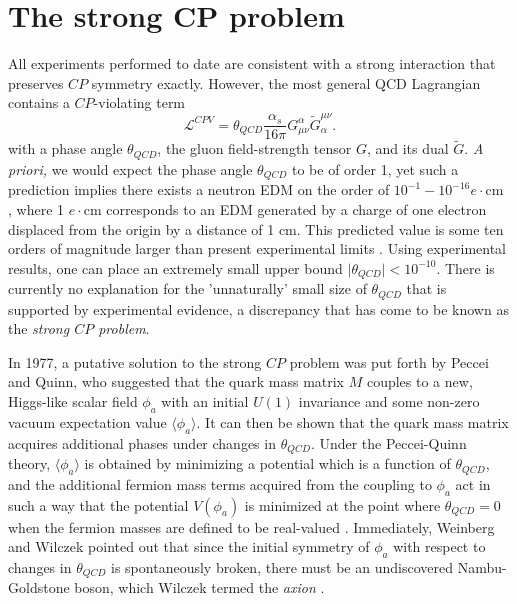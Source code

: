 \documentclass [10pt, twoside] {uwthesis}[2012/04/02]
\begin{document}
\section{The strong CP problem} %
All experiments performed to date are consistent with a strong interaction that preserves $CP$ symmetry exactly. However, the most general QCD Lagrangian contains a $CP$-violating term \begin{equation}\mathcal{L}^{CPV}=\theta_{QCD}\dfrac{\alpha_s}{16\pi}G^{\alpha}_{\mu\nu}\tilde{G}_{\alpha}^{\mu\nu}.\end{equation} with a phase angle $\theta_{QCD}$, the gluon field-strength tensor $G$, and its dual $\tilde{G}$. \textit{A priori,} we would expect the phase angle $\theta_{QCD}$ to be of order 1, yet such a prediction implies there exists a neutron EDM on the order of $10^{-1}-10^{-16} e\cdot \text{cm}$ \cite{1979_Baluni_nEDM_from_QCD} \cite{1979_Crewther_et._al._nEDM_from_QCD}, where 1 $e\cdot \text{cm}$ corresponds to an EDM generated by a charge of one electron displaced from the origin by a distance of 1 cm. This predicted value is some ten orders of magnitude larger than present experimental limits \cite{2006_ILL_nEDM}. Using experimental results, one can place an extremely small upper bound $\mid\theta_{QCD}\mid < 10^{-10}.$ There is currently no explanation for the 'unnaturally' small size of  $\theta_{QCD}$ that is supported by experimental evidence, a discrepancy that has come to be known as the \textit{strong $CP$ problem}. 

In 1977, a putative solution to the strong $CP$ problem was put forth by Peccei and Quinn, who suggested that the quark mass matrix $M$ couples to a new, Higgs-like scalar field $\phi_a$ with an initial $U(1)$ invariance and some non-zero vacuum expectation value $\langle\phi_a\rangle$. It can then be shown that the quark mass matrix acquires additional phases under changes in $\theta_{QCD}$. Under the Peccei-Quinn theory, $\langle\phi_a\rangle$ is obtained by minimizing a potential which is a function of $\theta_{QCD}$, and the additional fermion mass terms acquired from the coupling to $\phi_a$ act in such a way that the potential $V(\phi_a)$ is minimized at the point where $\theta_{QCD} = 0$ when the fermion masses are defined to be real-valued \cite{1977_Peccei_Quinn}. Immediately, Weinberg and Wilczek pointed out that since the initial symmetry of $\phi_a$ with respect to changes in $\theta_{QCD}$ is spontaneously broken, there must be an undiscovered Nambu-Goldstone boson, which Wilczek termed the \textit{axion} \cite{1978_Wilczek_axion}\cite{1978_Weinberg_axion}. 
\end{document}
